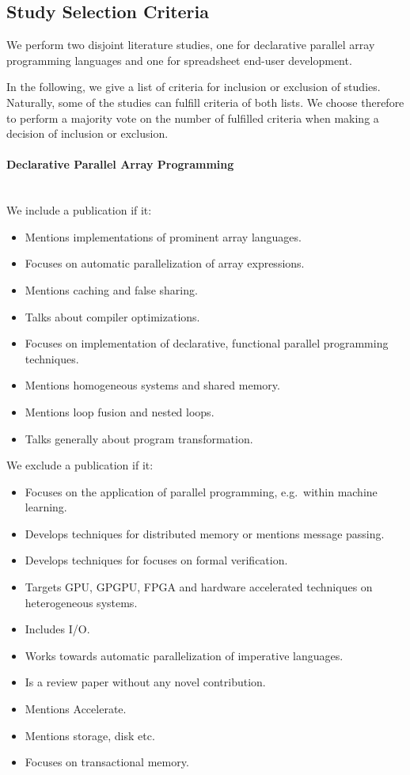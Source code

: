 \documentclass[a4paper]{article}
\begin{document}
\subsection{Study Selection Criteria}
\label{sec:study-select-crit}

We perform two disjoint literature studies, one for declarative
parallel array programming languages and one for spreadsheet end-user
development.

In the following, we give a list of criteria for inclusion or
exclusion of studies. Naturally, some of the studies can fulfill
criteria of both lists. We choose therefore to perform a majority vote
on the number of fulfilled criteria when making a decision of
inclusion or exclusion.

\paragraph{Declarative Parallel Array Programming}
~\\

We include a publication if it:

\begin{itemize}
\item Mentions implementations of prominent array languages.
\item Focuses on automatic parallelization of array expressions.
\item Mentions caching and false sharing.
\item Talks about compiler optimizations.
\item Focuses on implementation of declarative, functional parallel
  programming techniques.
\item Mentions homogeneous systems and shared memory.
\item Mentions loop fusion and nested loops.
\item Talks generally about program transformation.
\end{itemize}

We exclude a publication if it:

\begin{itemize}
\item Focuses on the application of parallel programming, e.g.\ within
  machine learning.
\item Develops techniques for distributed memory or mentions message
  passing.
\item Develops techniques for focuses on formal verification.
\item Targets GPU, GPGPU, FPGA and hardware accelerated techniques on
  heterogeneous systems.
\item Includes I/O.
\item Works towards automatic parallelization of imperative languages.
\item Is a review paper without any novel contribution.
\item Mentions Accelerate.
\item Mentions storage, disk etc.
\item Focuses on transactional memory.
\end{itemize}
\end{document}
